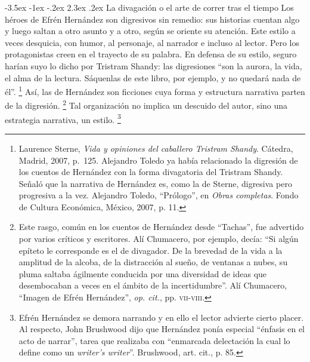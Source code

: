\documentclass[14pt,twoside,final]{extbook} %
\makeatletter
\let\oldfootnote\footnote
\renewcommand\footnote[1]{%
\oldfootnote{\hspace{1mm}#1}}
\renewcommand\section{\@startsection {section}{1}{\z@}%
                                     {-3.5ex \@plus -1ex \@minus -.2ex}%
                                     {2.3ex \@plus .2ex}%
                                     {\normalfont\large\bfseries\sc}}
\makeatother
\begin{document}
\section{La divagación o el arte de correr tras el tiempo}\label{sec:la-divagacion-o-el-arte-de-correr-tras-el-tiempo}
Los héroes de Efrén Hernández son digresivos sin remedio: sus historias cuentan algo y luego saltan a otro asunto y a otro, según se oriente su atención. Este estilo a veces desquicia, con humor, al personaje, al narrador e incluso al lector. Pero los protagonistas creen en el trayecto de su palabra. En defensa de su estilo, seguro harían suyo lo dicho por Tristram Shandy: las digresiones ``son la aurora, la vida, el alma de la lectura. Sáquenlas de este libro, por ejemplo, y no quedará nada de él''.\footnote{Laurence Sterne, \emph{Vida y opiniones del caballero Tristram Shandy}. Cátedra, Madrid, 2007, p.~125. Alejandro Toledo ya había relacionado la digresión de los cuentos de Hernández con la forma divagatoria del Tristram Shandy. Señaló que la narrativa de Hernández es, como la de Sterne, digresiva pero progresiva a la vez.  Alejandro Toledo, ``Prólogo'', en \emph{Obras completas}. Fondo de Cultura Económica, México, 2007, p. 11.} Así, las de Hernández son ficciones cuya forma y estructura narrativa parten de la digresión.\footnote{Este rasgo, común en los cuentos de Hernández desde ``Tachas'', fue advertido por varios críticos y escritores. Alí Chumacero, por ejemplo, decía: ``Si algún epíteto le corresponde es el de divagador. De la brevedad de la vida a la amplitud de la alcoba, de la distracción al sueño, de ventanas a nubes, su pluma saltaba ágilmente conducida por una diversidad de ideas que desembocaban a veces en el ámbito de la incertidumbre”. Alí Chumacero, ``Imagen de Efrén Hernández'', \emph{op. cit.}, pp. \textsc{vii-viii}.} Tal organización no implica un descuido del autor, sino una estrategia narrativa, un estilo.\footnote{Efrén Hernández se demora narrando y en ello el lector advierte cierto placer. Al respecto, John Brushwood dijo que Hernández ponía especial ``énfasis en el acto de narrar'', tarea que realizaba con ``enmarcada delectación la cual lo define como un \emph{writer’s writer}''. Brushwood, art. cit., p. 85.}
\end{document}
